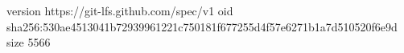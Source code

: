 version https://git-lfs.github.com/spec/v1
oid sha256:530ae4513041b72939961221c750181f677255d4f57e6271b1a7d510520f6e9d
size 5566
